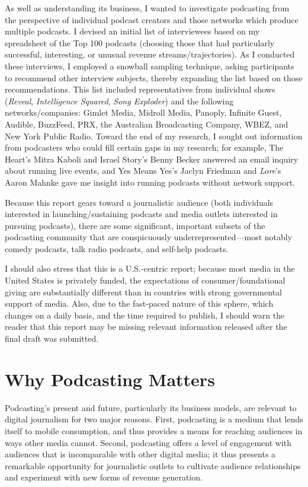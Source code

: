 \documentclass[notoc, symmetric, nobib, nols]{towcenter-guideto-book}
\begin{document}
As well as understanding its business, I wanted to investigate podcasting from the perspective of individual podcast creators and those networks which produce multiple podcasts. I devised an initial list of interviewees based on my spreadsheet of the Top 100 podcasts (choosing those that had particularly successful, interesting, or unusual revenue streams/trajectories). As I conducted these interviews, I employed a snowball sampling technique, asking participants to recommend other interview subjects, thereby expanding the list based on those recommendations. This list included representatives from individual shows (\textit{Reveal}, \textit{Intelligence Squared}, \textit{Song Exploder}) and the following networks/companies: Gimlet Media, Midroll Media, Panoply, Infinite Guest, Audible, BuzzFeed, PRX, the Australian Broadcasting Company, WBEZ, and New York Public Radio. Toward the end of my research, I sought out information from podcasters who could fill certain gaps in my research; for example, The Heart's Mitra Kaboli and Israel Story's Benny Becker answered an email inquiry about running live events, and Yes Means Yes's Jaclyn Friedman and \textit{Lore}'s Aaron Mahnke gave me insight into running podcasts without network support. 

Because this report gears toward a journalistic audience (both individuals interested in launching/sustaining podcasts and media outlets interested in pursuing podcasts), there are some significant, important subsets of the podcasting community that are conspicuously underrepresented---most notably comedy podcasts, talk radio podcasts, and self-help podcasts. 

I should also stress that this is a U.S.-centric report; because most media in the United States is privately funded, the expectations of consumer/foundational giving are substantially different than in countries with strong governmental support of media. Also, due to the fast-paced nature of this sphere, which changes on a daily basis, and the time required to publish, I should warn the reader that this report may be missing relevant information released after the final draft was submitted. 

\chapter{Why Podcasting Matters}

Podcasting's present and future, particularly its business models, are relevant to digital journalism for two major reasons. First, podcasting is a medium that lends itself to mobile consumption, and thus provides a means for reaching audiences in ways other media cannot. Second, podcasting offers a level of engagement with audiences that is incomparable with other digital media; it thus presents a remarkable opportunity for journalistic outlets to cultivate audience relationships and experiment with new forms of revenue generation.
\end{document}

